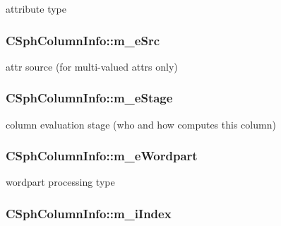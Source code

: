 attribute type 

\hypertarget{structCSphColumnInfo_afe3902493f80436499d412c0f24b5d77}{
\subsubsection[{m\-\_\-e\-Src}]{ C\-Sph\-Column\-Info\-::m\-\_\-e\-Src}}\label{structCSphColumnInfo_afe3902493f80436499d412c0f24b5d77}


attr source (for multi-\/valued attrs only) 

\hypertarget{structCSphColumnInfo_aeeba6f3600e5aad690b1fbcc104eb163}{
\subsubsection[{m\-\_\-e\-Stage}]{ C\-Sph\-Column\-Info\-::m\-\_\-e\-Stage}}\label{structCSphColumnInfo_aeeba6f3600e5aad690b1fbcc104eb163}


column evaluation stage (who and how computes this column) 

\hypertarget{structCSphColumnInfo_a2aa14fd1e59d61f608ca46c9a653d8e8}{
\subsubsection[{m\-\_\-e\-Wordpart}]{ C\-Sph\-Column\-Info\-::m\-\_\-e\-Wordpart}}\label{structCSphColumnInfo_a2aa14fd1e59d61f608ca46c9a653d8e8}


wordpart processing type 

\hypertarget{structCSphColumnInfo_aa9a9247300b6dd70ea3106e34628ff23}{
\subsubsection[{m\-\_\-i\-Index}]{ C\-Sph\-Column\-Info\-::m\-\_\-i\-Index}}\label{structCSphColumnInfo_aa9a9247300b6dd70ea3106e34628ff23}


